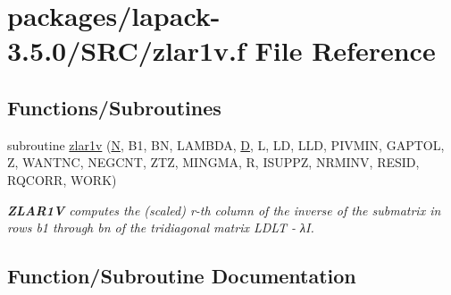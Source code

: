 \hypertarget{zlar1v_8f}{}\section{packages/lapack-\/3.5.0/\+S\+R\+C/zlar1v.f File Reference}
\label{zlar1v_8f}
\subsection*{Functions/\+Subroutines}
\begin{DoxyCompactItemize}
\item 
subroutine \hyperlink{zlar1v_8f_a73cdc9e22d7e051ee430030030f34ed6}{zlar1v} (\hyperlink{polmisc_8c_a0240ac851181b84ac374872dc5434ee4}{N}, B1, B\+N, L\+A\+M\+B\+D\+A, \hyperlink{odrpack_8h_a7dae6ea403d00f3687f24a874e67d139}{D}, L, L\+D, L\+L\+D, P\+I\+V\+M\+I\+N, G\+A\+P\+T\+O\+L, Z, W\+A\+N\+T\+N\+C, N\+E\+G\+C\+N\+T, Z\+T\+Z, M\+I\+N\+G\+M\+A, R, I\+S\+U\+P\+P\+Z, N\+R\+M\+I\+N\+V, R\+E\+S\+I\+D, R\+Q\+C\+O\+R\+R, W\+O\+R\+K)
\begin{DoxyCompactList}\small\item\em {\bfseries Z\+L\+A\+R1\+V} computes the (scaled) r-\/th column of the inverse of the submatrix in rows b1 through bn of the tridiagonal matrix L\+D\+L\+T -\/ λ\+I. \end{DoxyCompactList}\end{DoxyCompactItemize}


\subsection{Function/\+Subroutine Documentation}
\hypertarget{zlar1v_8f_a73cdc9e22d7e051ee430030030f34ed6}{}
